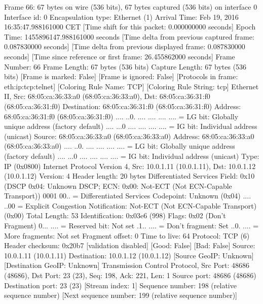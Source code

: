 Frame 66: 67 bytes on wire (536 bits), 67 bytes captured (536 bits) on interface 0
    Interface id: 0
    Encapsulation type: Ethernet (1)
    Arrival Time: Feb 19, 2016 16:35:47.988161000 CET
    [Time shift for this packet: 0.000000000 seconds]
    Epoch Time: 1455896147.988161000 seconds
    [Time delta from previous captured frame: 0.087830000 seconds]
    [Time delta from previous displayed frame: 0.087830000 seconds]
    [Time since reference or first frame: 26.455862000 seconds]
    Frame Number: 66
    Frame Length: 67 bytes (536 bits)
    Capture Length: 67 bytes (536 bits)
    [Frame is marked: False]
    [Frame is ignored: False]
    [Protocols in frame: eth:ip:tcp:telnet]
    [Coloring Rule Name: TCP]
    [Coloring Rule String: tcp]
Ethernet II, Src: 68:05:ca:36:33:a0 (68:05:ca:36:33:a0), Dst: 68:05:ca:36:31:f0 (68:05:ca:36:31:f0)
    Destination: 68:05:ca:36:31:f0 (68:05:ca:36:31:f0)
        Address: 68:05:ca:36:31:f0 (68:05:ca:36:31:f0)
        .... ..0. .... .... .... .... = LG bit: Globally unique address (factory default)
        .... ...0 .... .... .... .... = IG bit: Individual address (unicast)
    Source: 68:05:ca:36:33:a0 (68:05:ca:36:33:a0)
        Address: 68:05:ca:36:33:a0 (68:05:ca:36:33:a0)
        .... ..0. .... .... .... .... = LG bit: Globally unique address (factory default)
        .... ...0 .... .... .... .... = IG bit: Individual address (unicast)
    Type: IP (0x0800)
Internet Protocol Version 4, Src: 10.0.1.11 (10.0.1.11), Dst: 10.0.1.12 (10.0.1.12)
    Version: 4
    Header length: 20 bytes
    Differentiated Services Field: 0x10 (DSCP 0x04: Unknown DSCP; ECN: 0x00: Not-ECT (Not ECN-Capable Transport))
        0001 00.. = Differentiated Services Codepoint: Unknown (0x04)
        .... ..00 = Explicit Congestion Notification: Not-ECT (Not ECN-Capable Transport) (0x00)
    Total Length: 53
    Identification: 0x03e6 (998)
    Flags: 0x02 (Don't Fragment)
        0... .... = Reserved bit: Not set
        .1.. .... = Don't fragment: Set
        ..0. .... = More fragments: Not set
    Fragment offset: 0
    Time to live: 64
    Protocol: TCP (6)
    Header checksum: 0x20b7 [validation disabled]
        [Good: False]
        [Bad: False]
    Source: 10.0.1.11 (10.0.1.11)
    Destination: 10.0.1.12 (10.0.1.12)
    [Source GeoIP: Unknown]
    [Destination GeoIP: Unknown]
Transmission Control Protocol, Src Port: 48686 (48686), Dst Port: 23 (23), Seq: 198, Ack: 221, Len: 1
    Source port: 48686 (48686)
    Destination port: 23 (23)
    [Stream index: 1]
    Sequence number: 198    (relative sequence number)
    [Next sequence number: 199    (relative sequence number)]
